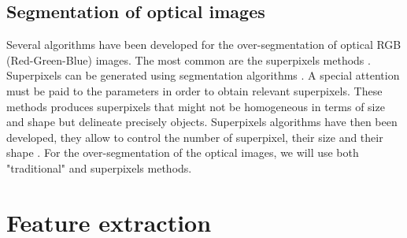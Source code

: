 \subsection{Segmentation of optical images}
Several algorithms have been developed for the over-segmentation of optical RGB (Red-Green-Blue) images. The most common are the superpixels methods \citep{achanta2012slic}. Superpixels can be generated using segmentation algorithms \citep{shi2000normalized, felzenszwalb2004efficient, comaniciu2002mean, vedaldi2008quick, vincent1991watersheds}. A special attention must be paid to the parameters in order to obtain relevant superpixels. These methods produces superpixels that might not be homogeneous in terms of size and shape but delineate precisely objects.
Superpixels algorithms have then been developed, they allow to control the number of superpixel, their size and their shape \citep{moore2008superpixel, veksler2010superpixels, levinshtein2009turbopixels, achanta2012slic}.
For the over-segmentation of the optical images, we will use both "traditional" and superpixels methods.

\section{Feature extraction}
